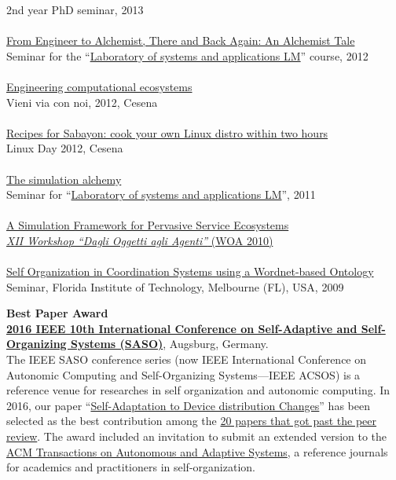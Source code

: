 \documentclass[10pt]{article}
\renewcommand{\section}[2]%
        {\pagebreak[3]\vspace{1.3\baselineskip}%
         \phantomsection\addcontentsline{toc}{section}{#1}%
         \hspace{0in}%
         \marginpar{
         \raggedright \scshape #1}#2}
\newcommand{\halfblankline}{\quad\vspace{-0.5\baselineskip}\pagebreak[3]}
\begin{document}
2nd year PhD seminar, 2013
\\ \halfblankline \\
\href{http://campus.unibo.it/115195/}{From Engineer to Alchemist, There and Back Again: An Alchemist Tale} \\
Seminar for the ``\href{http://apice.unibo.it/xwiki/bin/view/Courses/LsaLm1213}{Laboratory of systems and applications LM}'' course, 2012
\\ \halfblankline \\
\href{https://www.slideshare.net/DanySK/engineering-computational-ecosystems}{Engineering computational ecosystems} \\
Vieni via con noi, 2012, Cesena
\\ \halfblankline \\
\href{https://www.slideshare.net/DanySK/recipes-for-sabayon-cook-your-own-linux-distro-within-two-hours}{Recipes for Sabayon: cook your own Linux distro within two hours} \\
Linux Day 2012, Cesena
\\ \halfblankline \\
\href{http://campus.unibo.it/83921/}{The simulation alchemy} \\
Seminar for ``\href{http://apice.unibo.it/xwiki/bin/view/Courses/LsaLm1112}{Laboratory of systems and applications LM}'', 2011
\\ \halfblankline \\
\href{http://apice.unibo.it/xwiki/bin/view/Talks/PianiniWoa2011}{A Simulation Framework for Pervasive Service Ecosystems} \\
\href{http://www.inf.u-szeged.hu/projectdirs/saso10/}{\textit{XII Workshop ``Dagli Oggetti agli Agenti''} (WOA 2010)}
\\ \halfblankline \\
\href{}{Self Organization in Coordination Systems using a Wordnet-based Ontology} \\
Seminar, Florida Institute of Technology, Melbourne (FL), USA, 2009

\section{Awards}
\textbf{Best Paper Award}\\
\href{https://saso2016.informatik.uni-augsburg.de/}{\textbf{2016 IEEE 10th International Conference on Self-Adaptive and Self-Organizing Systems (SASO)}}, Augsburg, Germany.\\
The IEEE SASO conference series
(now IEEE International Conference on Autonomic Computing and Self-Organizing Systems---IEEE ACSOS)
is a reference venue for researches in self organization and autonomic computing.
In 2016, our paper
``\href{https://ieeexplore.ieee.org/document/7774387}{Self-Adaptation to Device distribution Changes}''
has been selected as the best contribution among the
\href{https://ieeexplore.ieee.org/xpl/conhome/7774239/proceeding?rowsPerPage=50&pageNumber=1}{20 papers that got past the peer review}.
The award included an invitation to submit an extended version to the
\href{https://dl.acm.org/journal/taas}{ACM Transactions on Autonomous and Adaptive Systems},
a reference journals for academics and practitioners in self-organization.
\end{document}
